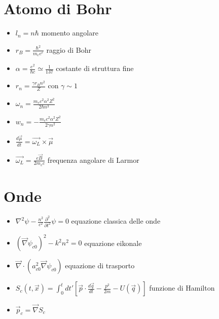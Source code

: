 \documentclass[a4paper]{article}
\begin{document}
    \section{Atomo di Bohr}
        \begin{itemize}
            \item $l_n=n\hbar$ momento angolare
            \item $r_B=\frac{\hbar^2}{m_ee^e}$ raggio di Bohr
            \item $\alpha=\frac{e^2}{\hbar c}\simeq\frac{1}{137}$ costante di struttura fine
            \item $r_n=\frac{\gamma r_Bn^2}{Z}$ con $\gamma\sim 1$
            \item $\omega_n=\frac{m_ec^2\alpha^2Z^2}{2\hbar n^3}$
            \item $w_n=-\frac{m_ec^2\alpha^2Z^2}{2\gamma n^2}$
            \item $\frac{d\vec{\mu}}{dt}=\vec{\omega_L}\times\vec{\mu}$
            \item $\vec{\omega_L}=\frac{e\vec{B}}{2m_ec}$ frequenza angolare di Larmor
        \end{itemize}
    
    \section{Onde}
        \begin{itemize}
            \item $\nabla^2\psi-\frac{n^2}{c^2}\frac{\partial^2}{\partial t^2}\psi=0$ equazione classica delle onde
            \item $(\vec{\nabla}\psi_{c0})^2-k^2n^2=0$ equazione eikonale
            \item $\vec{\nabla}\cdot(a_{c0}^2\vec{\nabla}\psi_{c0})$ equazione di trasporto
            \item $S_c(t,\vec{x})=\int_0^t dt'\left[\vec{p}\cdot\frac{d\vec{q}}{dt}-\frac{p^2}{2m}-U(\vec{q})\right]$ funzione di Hamilton
            \item $\vec{p}_c=\vec{\nabla}S_c$
        \end{itemize}
\end{document}
